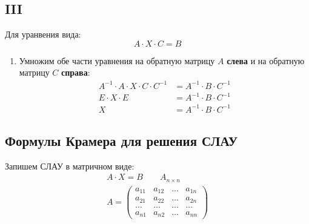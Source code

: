 \subsection*{III}

Для уранвения вида: \[
A \cdot X \cdot C = B
\] 
\begin{enumerate}
  \item Умножим обе части уравнения на обратную матрицу $A$ \textbf{слева} и на обратную матрицу $C$ \textbf{справа}:
  \begin{align*}
    A^{-1} \cdot  A \cdot  X \cdot C \cdot C^{-1} &= A^{-1} \cdot B \cdot C^{-1} \\
    E \cdot  X \cdot E &= A^{-1} \cdot B \cdot C^{-1} \\
    X &= A^{-1} \cdot B \cdot C^{-1}
  \end{align*}
\end{enumerate}

\subsection{Формулы Крамера для решения СЛАУ}

Запишем СЛАУ в матричном виде: 
\begin{gather*}
  A \cdot X = B \qquad A_{n \times n} \\
  A = \left( 
  \begin{matrix}
    a_{11} & a_{12} & \ldots & a_{1n} \\
    a_{21} & a_{22} & \ldots & a_{2n} \\
    \ldots & \ldots & \ldots & \ldots \\
    a_{n1} & a_{n2} & \ldots & a_{nn}
  \end{matrix}
  \right) 
\end{gather*}

